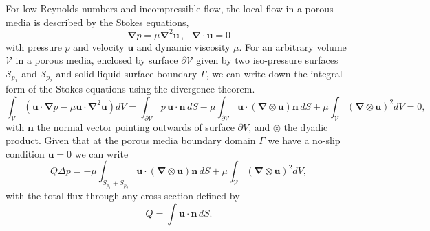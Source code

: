 \documentclass[draft]{agujournal2019}
\begin{document}
For low Reynolds numbers and incompressible flow, the local flow in a porous media is described by the Stokes equations,
\begin{equation}
	\mathbf{\nabla} p =  \mu\mathbf{\nabla}^2 \mathbf{u}\,,~~~\mathbf{\nabla}\cdot\mathbf{u}=0\label{eq:stokes_local}
	\end{equation}
with pressure $p$ and velocity $\mathbf{u}$ and dynamic viscosity $\mu$. For an arbitrary volume $\mathcal{V}$ in a porous media, enclosed by surface $\partial \mathcal{V}$ given by two iso-pressure surfaces $\mathcal{S}_{p_1}$ and $\mathcal{S}_{p_2}$ and solid-liquid surface boundary $\Gamma$, we can write down the integral form of the Stokes equations using the divergence theorem. 
\begin{equation}
\int_{\mathcal{V}} \left(\mathbf{u}\cdot\mathbf{\nabla} p-\mu \mathbf{u}\cdot\mathbf{\nabla}^2 \mathbf{u}\right) dV 
= \int_{\partial \mathcal{V}}  p\,\mathbf{u}\cdot\mathbf{n}\,dS-\mu \int_{\partial \mathcal{V}} \mathbf{u}\cdot (\mathbf{\nabla}\otimes \mathbf{u})\mathbf{n}\,dS+\mu \int_{\mathcal{V}} (\mathbf{\nabla}\otimes\mathbf{u})^2 dV=0, \label{eq:stokes_dissipation}
\end{equation}
with $\mathbf{n}$ the normal vector pointing outwards of surface $\partial V$, and $\otimes$ the dyadic product. Given that at the porous media boundary domain $\Gamma$ we have a no-slip condition $\mathbf{u}=0$ we can write 
\begin{equation}
	Q \Delta p = -\mu\int_{S_{p_1}+S_{p_2}} \mathbf{u}\cdot (\mathbf{\nabla}\otimes \mathbf{u})\mathbf{n}\,dS +\mu \int_{\mathcal{V}} (\mathbf{\nabla}\otimes \mathbf{u})^2 dV, \label{eq:pressuredrop}
\end{equation}
with the total flux through any cross section defined by 
\begin{equation}
	Q=\int \mathbf{u}\cdot\mathbf{n}\, dS.
\end{equation}
\end{document}
